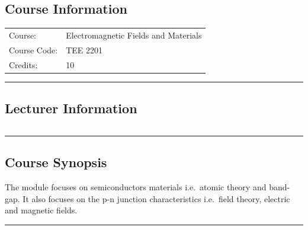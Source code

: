 
\subsection*{Course Information}
\vspace{0ex}%
\noindent\parbox{0.5\textwidth}{%
    \noindent\begin{tabular}{@{}ll}
                 \textsf{Course:}          & Electromagnetic Fields and Materials \\
                 \textsf{Course Code:}         & 	TEE 2201    \\
                 \textsf{Credits:}    & 	10
    \end{tabular}}
\vspace{2ex}\hrule\vspace{2ex}

\subsection*{Lecturer Information}
\noindent\parbox{0.5\textwidth}{%
    \noindent\begin{tabular}{@{}ll}
                 
    \end{tabular}}
\vspace{2ex}\hrule\vspace{2ex}


\subsection*{Course Synopsis}
The module focuses on semiconductors materials i.e.\ atomic theory and band-gap.
It also focuses on the p-n junction characteristics i.e.\ field theory, electric and magnetic fields.
\vspace{2ex} \hrule\vspace{2ex}

